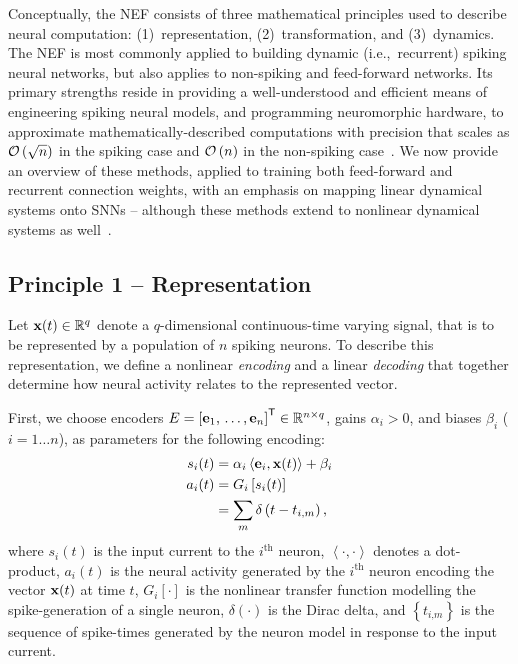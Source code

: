 Conceptually, the NEF consists of three mathematical principles used to describe neural computation: (1)~representation, (2)~transformation, and (3)~dynamics.
The NEF is most commonly applied to building dynamic (i.e.,~recurrent) spiking neural networks, but also applies to non-spiking and feed-forward networks.
Its primary strengths reside in providing a well-understood and efficient means of engineering spiking neural models, and programming neuromorphic hardware, to approximate mathematically-described computations with precision that scales as $\mathcal{O}\left({\sqrt{n}}\right)$ in the spiking case and $\mathcal{O}\left({n}\right)$ in the non-spiking case~\citep{eliasmith2003a, boahen2017neuromorph}.
We now provide an overview of these methods, applied to training both feed-forward and recurrent connection weights, with an emphasis on mapping linear dynamical systems onto SNNs -- although these methods extend to nonlinear dynamical systems as well~\citep{voelker2017iscas, voelker2017neuromorphic}.

\subsection{Principle 1 -- Representation}
\label{sec:principle1}

Let $\mathbf{x}(t) \in \mathbb{R}^q$ denote a $q$-dimensional continuous-time varying signal, that is to be represented by a population of $n$ spiking neurons.
To describe this representation, we define a nonlinear \emph{encoding} and a linear \emph{decoding} that together determine how neural activity relates to the represented vector.

First, we choose encoders $E = {\left[ \mathbf{e}_1\text{,}\, \ldots\text{,}\, \mathbf{e}_n \right]}^\mathsf{T} \in \mathbb{R}^{n \times q}$, gains $\alpha_i > 0$, and biases $\beta_i$ ($i = 1 \ldots n$), as parameters for the following encoding:
\begin{equation}
\begin{aligned} \label{eq:encoding}
s_i(t) &= \alpha_i \left\langle \mathbf{e}_i\text{,}\, \mathbf{x}(t) \right\rangle + \beta_i \\
a_i(t) &= G_i \left[ s_i(t) \right] \\
&= \sum_m \delta \left(t - t_{i\text{,}m} \right) \text{,}
\end{aligned}
\end{equation}
where $s_i(t)$ is the input current to the $i^\text{th}$ neuron, $\left\langle \cdot , \cdot \right\rangle$ denotes a dot-product,
$a_i(t)$ is the neural activity generated by the $i^{\text{th}}$ neuron encoding the vector $\mathbf{x}(t)$ at time $t$, $G_i \left[ \cdot \right]$ is the nonlinear transfer function modelling the spike-generation of a single neuron,
$\delta(\cdot)$ is the Dirac delta, and $\left\{ t_{i\text{,}m} \right\}$ is the sequence of spike-times generated by the neuron model in response to the input current.

